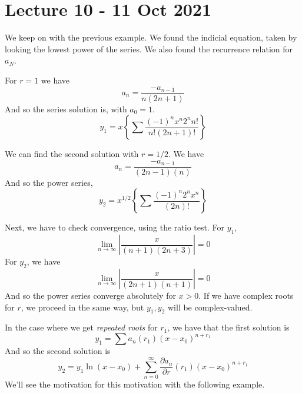 \section{Lecture 10 - 11 Oct 2021}
We keep on with the previous example. We found the indicial equation, taken by looking the
lowest power of the series. We also found the recurrence relation for $a_N$.

For $r=1$ we have
\[a_n = \frac{-a_{n-1}}{n(2n+1)}\]
And so the series solution is, with $a_0=1$. 
\[y_1 = x\left\{ \sum \frac{(-1)^n x^n 2^n n!}{n!(2n+1)!} \right\}\]

We can find the second solution with $r=1/2$. We have
\[a_{n} = \frac{-a_{n-1}}{(2n-1)(n)}\]
And so the power series,
\[y_{2} = x^{1/2} \left\{ \sum \frac{(-1)^n 2^n x^n}{(2n)!} \right\}\]

Next, we have to check convergence, using the ratio test. For $y_1$,
\[\lim_{n\to\infty} |\frac{x}{(n+1)(2n+3)}| = 0\]
For $y_2$, we have
\[\lim_{n\to\infty} |\frac{x}{(2n+1)(n+1)}|= 0\]
And so the power series converge absolutely for $x>0$. If we have complex roots for $r$,
we proceed in the same way, but $y_1,y_2$ will be complex-valued. 

In the case where we get \emph{repeated roots} for $r_1$, we have that the first solution is
\[y_1 = \sum a_n(r_1) (x-x_0)^{n+r_1}\]
And so the second solution is 
\[y_2 = y_1 \ln (x-x_0) + \sum_{n=0}^{\infty} \frac{\partial a_n}{\partial r} (r_1)
(x-x_0)^{n+r_1}\]
We'll see the motivation for this motivation with the following example.

